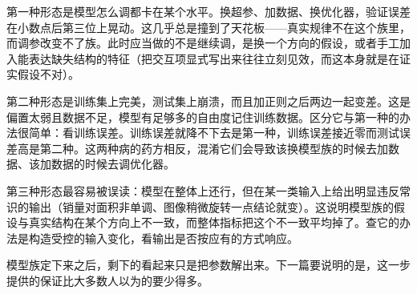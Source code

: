 第一种形态是模型怎么调都卡在某个水平。换超参、加数据、换优化器，验证误差在小数点后第三位上晃动。这几乎总是撞到了天花板——真实规律不在这个族里，而调参改变不了族。此时应当做的不是继续调，是换一个方向的假设，或者手工加入能表达缺失结构的特征（把交互项显式写出来往往立刻见效，而这本身就是在证实假设不对）。

第二种形态是训练集上完美，测试集上崩溃，而且加正则之后两边一起变差。这是偏置太弱且数据不足，模型有足够多的自由度记住训练数据。区分它与第一种的办法很简单：看训练误差。训练误差就降不下去是第一种，训练误差接近零而测试误差高是第二种。这两种病的药方相反，混淆它们会导致该换模型族的时候去加数据、该加数据的时候去调优化器。

第三种形态最容易被误读：模型在整体上还行，但在某一类输入上给出明显违反常识的输出（销量对面积非单调、图像稍微旋转一点结论就变）。这说明模型族的假设与真实结构在某个方向上不一致，而整体指标把这个不一致平均掉了。查它的办法是构造受控的输入变化，看输出是否按应有的方式响应。

模型族定下来之后，剩下的看起来只是把参数解出来。下一篇要说明的是，这一步提供的保证比大多数人以为的要少得多。
